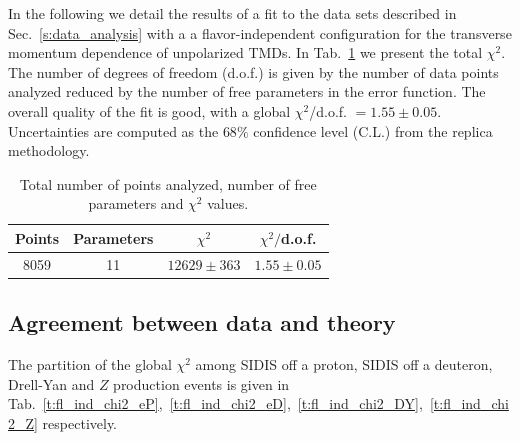 \documentclass[aps,preprintnumbers,showpacs,nofootinbib,superscriptaddress,floatfix]{revtex4}
\begin{document}
In the following we detail the results of a fit to the data sets described in Sec.~\ref{s:data_analysis} with a a flavor-independent configuration for the transverse momentum dependence of unpolarized TMDs.
In Tab.~\ref{t:fl_ind_chi2} we present the total $\chi^2$. The number of degrees of freedom (d.o.f.) is given by the number of data points analyzed reduced by the number of free parameters in the error function. 
The overall quality of the fit is good, with a global $\chi^2$/d.o.f. $= 1.55 \pm 0.05$. Uncertainties are computed as the $68\%$ confidence level (C.L.) from the replica methodology. 
\begin{table}[h!]
\small
  \centering
  \begin{tabular}{|c|c|c|c|}
\hline
\hline
Points& Parameters & $\chi^2$& $\chi^2/$d.o.f. \\
\hline
8059 & 11  & $12629 \pm 363$ & $1.55 \pm 0.05$ \\
\hline
\hline
\end{tabular}
\caption{Total number of points analyzed, number of free parameters and $\chi^2$ values.}
\label{t:fl_ind_chi2}
\end{table}


\subsection{Agreement between data and theory}
\label{ss:data_vs_theory}

The partition of the global $\chi^2$ among SIDIS off a proton, SIDIS off a
deuteron, Drell-Yan and $Z$ production events is given in
Tab.~\ref{t:fl_ind_chi2_eP},~\ref{t:fl_ind_chi2_eD},~\ref{t:fl_ind_chi2_DY},~\ref{t:fl_ind_chi2_Z}
respectively.  
\end{document}
